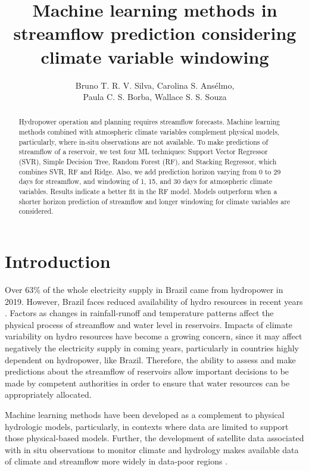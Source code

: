 \documentclass[12pt]{article}
\title{Machine learning methods in streamflow prediction  considering climate variable windowing}
\author{%
    Bruno T. R. V. Silva\inst{1}, %
    Carolina S. Ansélmo\inst{1}, \\%
    Paula C. S. Borba\inst{1}, %
    Wallace S. S. Souza\inst{1}%
}
\begin{document}
\maketitle

\begin{abstract}
    Hydropower operation and planning requires streamflow forecasts. Machine learning methods combined with atmospheric climate variables complement physical models, particularly, where in-situ observations are not available. To make predictions of streamflow of a reservoir, we test four ML techniques: Support Vector Regressor (SVR), Simple Decision Tree, Random Forest (RF), and Stacking Regressor, which combines SVR, RF and Ridge. Also, we add prediction horizon varying from 0 to 29 days for streamflow, and windowing of 1, 15, and 30 days for atmospheric climate variables. Results indicate a better fit in the RF model. Models outperform when a shorter horizon prediction of streamflow and longer windowing for climate variables are considered.

\end{abstract}


\section{Introduction}

Over 63\% of the whole electricity supply in Brazil came from hydropower in 2019. However, Brazil faces reduced availability of hydro resources in recent years \cite{onsseca}. Factors as changes in rainfall-runoff and temperature patterns affect the physical process of streamflow and water level in reservoirs. Impacts of climate variability on hydro resources have become a growing concern, since it may affect negatively the electricity supply in coming years, particularly in countries highly dependent on hydropower, like Brazil. Therefore, the ability to assess and make predictions about the streamflow of reservoirs allow important decisions to be made by competent authorities in order to ensure that water resources can be appropriately allocated.

Machine learning methods have been developed as a complement to physical hydrologic models, particularly, in contexts where data are limited to support those physical-based models. Further, the development of satellite data associated with in situ observations to monitor climate and hydrology makes available data of climate and streamflow more widely in data-poor regions \cite{julie}.
\end{document}

